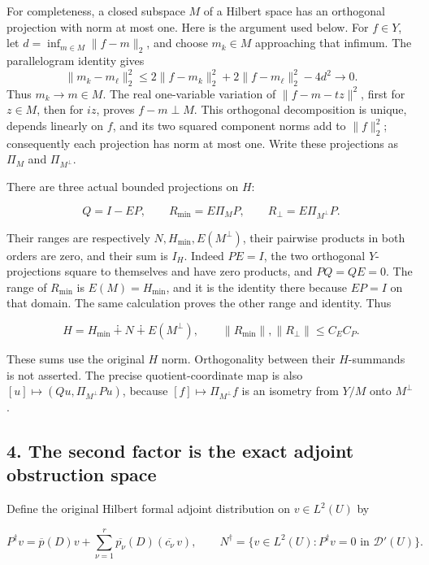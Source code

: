 \documentclass[
  11pt,
]{article}
\begin{document}
For completeness, a closed subspace \(M\) of a
Hilbert space has an orthogonal projection with norm at most one. Here
is the argument used below. For \(f\in Y\), let
\(d=\inf_{m\in M}\|f-m\|_2\), and choose \(m_k\in M\)
approaching that infimum. The parallelogram identity gives
\[
 \|m_k-m_\ell\|_2^2
 \leq 2\|f-m_k\|_2^2+2\|f-m_\ell\|_2^2-4d^2\longrightarrow0.
\] Thus \(m_k\to m\in M\). The real
one-variable variation of \(\|f-m-tz\|^2\), first for
\(z\in M\), then for \(iz\), proves
\(f-m\perp M\). This orthogonal decomposition is unique,
depends linearly on \(f\), and its two squared
component norms add to \(\|f\|_2^2\); consequently each
projection has norm at most one. Write these projections as
\(\Pi_M\) and \(\Pi_{M^\perp}\).

There are three actual bounded projections on
\(H\):

\[
 Q=I-EP,
 \qquad R_{\min}=E\Pi_M P,
 \qquad R_{\perp}=E\Pi_{M^\perp}P.
 \tag{GM21}
\]

Their ranges are respectively \(N,H_{\min},E(M^\perp)\), their pairwise
products in both orders are zero, and their sum is
\(I_H\). Indeed \(PE=I\), the two
orthogonal \(Y\)-projections square to themselves
and have zero products, and \(PQ=QE=0\). The range of
\(R_{\min}\) is \(E(M)=H_{\min}\), and it is the
identity there because \(EP=I\) on that domain. The
same calculation proves the other range and identity. Thus

\[
 H=H_{\min}\mathbin{\dotplus}N\mathbin{\dotplus}E(M^\perp),
 \qquad
 \|R_{\min}\|,\|R_{\perp}\|\leq C_EC_P.
 \tag{GM22}
\]

These sums use the original \(H\) norm.
Orthogonality between their \(H\)-summands is not
asserted. The precise quotient-coordinate map is also
\([u]\mapsto(Qu,\Pi_{M^\perp}Pu)\), because \([f]\mapsto\Pi_{M^\perp}f\) is an
isometry from \(Y/M\) onto
\(M^\perp\).

\subsection{4. The second factor is the exact adjoint obstruction
space}\label{the-second-factor-is-the-exact-adjoint-obstruction-space}

Define the original Hilbert formal adjoint distribution on
\(v\in L^2(U)\) by

\[
 P^\dagger v
   =\overline p(D)v
       +\sum_{\nu=1}^r\overline{p_\nu}(D)
                           (\overline{c_\nu}\,v),
 \qquad
 N^\dagger=\{v\in L^2(U):P^\dagger v=0\text{ in }\mathcal D'(U)\}.
 \tag{GM23}
\]
\end{document}
